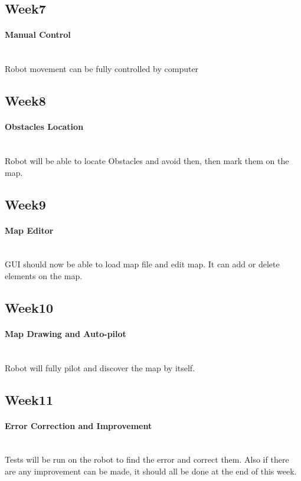 \documentclass[11pt, a4paper]{report}
\begin{document}
\subsection{Week7}
\paragraph{Manual Control}\\
Robot movement can be fully controlled by computer 


\subsection{Week8}
\paragraph{Obstacles Location}\\
Robot will be able to locate Obstacles and avoid then, then mark them on the map.


\subsection{Week9}
\paragraph{Map Editor}\\
GUI should now be able to load map file and edit map. It can add or delete elements on the map.




\subsection{Week10}
\paragraph{Map Drawing and Auto-pilot}\\
Robot will fully pilot and discover the map by itself.


\subsection{Week11}
\paragraph{Error Correction and Improvement}\\
Tests will be run on the robot to find the error and correct them. Also if there are any improvement can be made, it should all be done at the end of this week.
\end{document}
